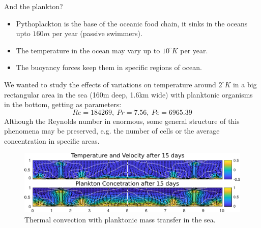 \documentclass[final]{beamer}
\newlength{\onecolwid}
\begin{document}
\begin{frame}[t]
\begin{columns}[t]
\begin{column}{\onecolwid}

\begin{block}{And the plankton?}
	\begin{itemize}
		\item Pythoplackton is the base of the oceanic food chain, it sinks in the oceans upto $160 m$ per year (passive swimmers).
		\item The temperature in the ocean may vary up to $10^{\circ}K$ per year.
		\item The buoyancy forces keep them in specific regions of ocean.
	\end{itemize}
	We wanted to study the effects of variations on temperature around $2^{\circ}K$ in a big rectangular area in the sea (160m deep, 1.6km wide) with planktonic organisms in the bottom, getting as parameters:
	$$Re=184269, \: Pr=7.56, \: Pe=6965.39$$
	Although the Reynolds number in enormous, some general structure of this phenomena may be preserved, e.g. the number of cells or the average concentration in specific areas.
	
\begin{figure}
\includegraphics[width=1.0\linewidth]{images/planktonSim.pdf}
\caption{Thermal convection with planktonic mass transfer in the sea.}
\end{figure}

\end{block}




\end{column}
\end{columns}
\end{frame}
\end{document}
